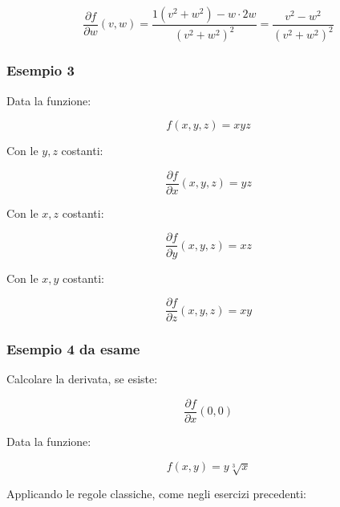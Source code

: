 \documentclass[a4paper]{article}
\begin{document}
	\begin{equation*}
		\dfrac{\partial f}{\partial w}\left(v,w\right) = \dfrac{1\left(v^{2} + w^{2}\right) - w \cdot 2w}{\left(v^{2} + w^{2}\right)^{2}} = \dfrac{v^{2} - w^{2}}{\left(v^{2} + w^{2}\right)^{2}}
	\end{equation*}

	\subsubsection[Esempio 3]{\textcolor{Green4}{Esempio 3}}
	
	Data la funzione:
	
	\begin{equation*}
		f\left(x,y,z\right) = xyz
	\end{equation*}

	\noindent
	Con le $y,z$ costanti:
	
	\begin{equation*}
		\dfrac{\partial f}{\partial x}\left(x,y,z\right) = yz
	\end{equation*}

	\noindent
	Con le $x,z$ costanti:
	
	\begin{equation*}
		\dfrac{\partial f}{\partial y}\left(x,y,z\right) = xz
	\end{equation*}

	\noindent
	Con le $x,y$ costanti:
	
	\begin{equation*}
		\dfrac{\partial f}{\partial z}\left(x,y,z\right) = xy
	\end{equation*}

	\newpage
	
	\subsubsection{Esempio 4 da \textcolor{Red3}{esame}}
	
	Calcolare la derivata, se esiste:
	
	\begin{equation*}
		\dfrac{\partial f}{\partial x}\left(0,0\right)
	\end{equation*}

	\noindent
	Data la funzione:
	
	\begin{equation*}
		f\left(x,y\right) = y \sqrt[3]{x}
	\end{equation*}

	\noindent
	Applicando le regole classiche, come negli esercizi precedenti:
	
\end{document}
